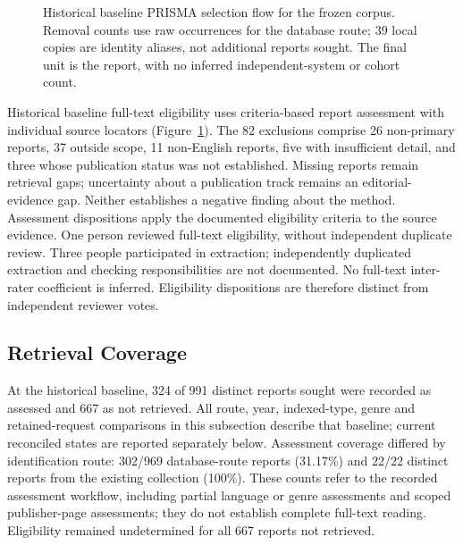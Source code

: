 \documentclass[manuscript,review,screen]{acmart}
\begin{document}
\begin{figure}[htbp]
\caption{Historical baseline PRISMA selection flow for the frozen corpus. Removal counts use raw occurrences for the database route; 39 local copies are identity aliases, not additional reports sought. The final unit is the report, with no inferred independent-system or cohort count.}
\label{fig:prisma}
\end{figure}

Historical baseline full-text eligibility uses criteria-based report assessment with individual source locators (Figure~\ref{fig:prisma}). The 82 exclusions comprise 26 non-primary reports, 37 outside scope, 11 non-English reports, five with insufficient detail, and three whose publication status was not established. Missing reports remain retrieval gaps; uncertainty about a publication track remains an editorial-evidence gap. Neither establishes a negative finding about the method. Assessment dispositions apply the documented eligibility criteria to the source evidence. One person reviewed full-text eligibility, without independent duplicate review. Three people participated in extraction; independently duplicated extraction and checking responsibilities are not documented. No full-text inter-rater coefficient is inferred. Eligibility dispositions are therefore distinct from independent reviewer votes.

\subsection{Retrieval Coverage}
\label{sec:retrieval-coverage-proposal}

At the historical baseline, 324 of 991 distinct reports sought were recorded as assessed and 667 as not retrieved. All route, year, indexed-type, genre and retained-request comparisons in this subsection describe that baseline; current reconciled states are reported separately below. Assessment coverage differed by identification route: 302/969 database-route reports (31.17\%) and 22/22 distinct reports from the existing collection (100\%). These counts refer to the recorded assessment workflow, including partial language or genre assessments and scoped publisher-page assessments; they do not establish complete full-text reading. Eligibility remained undetermined for all 667 reports not retrieved.
\end{document}
